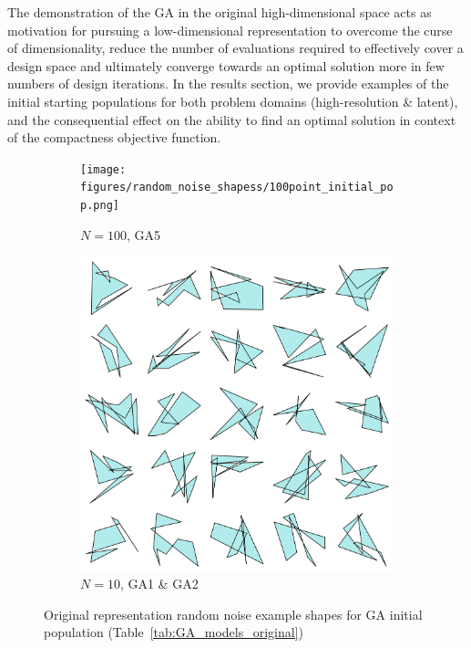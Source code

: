 \documentclass{article}
\begin{document}
The demonstration of the GA in the original high-dimensional space acts as motivation for pursuing a low-dimensional representation to overcome the curse of dimensionality, reduce the number of evaluations required to effectively cover a design space and ultimately converge towards an optimal solution more in few numbers of design iterations. In the results section, we provide examples of the initial starting populations for both problem domains (high-resolution \& latent), and the consequential effect on the ability to find an optimal solution in context of the compactness objective function.

\begin{figure}[h]
    \centering
    \begin{subfigure}[b]{0.45\textwidth}
        \centering
        \texttt{[image: figures/random\_noise\_shapess/100point\_initial\_pop.png]}
        \caption{$N=100$, GA5}
        \label{fig:high_res_noise_100}
    \end{subfigure}
    \hfill
    \begin{subfigure}[b]{0.45\textwidth}
        \centering
        \includegraphics[width=\textwidth]{figures/random_noise_shapess/10point_initial_pop.png}
        \caption{$N=10$, GA1 \& GA2}
        \label{fig:high_res_noise_10}
    \end{subfigure}
    \caption{Original representation random noise example shapes for GA initial population (Table~\ref{tab:GA_models_original})}
    \label{fig:random_noise_ga_shapes}
\end{figure}
\end{document}
